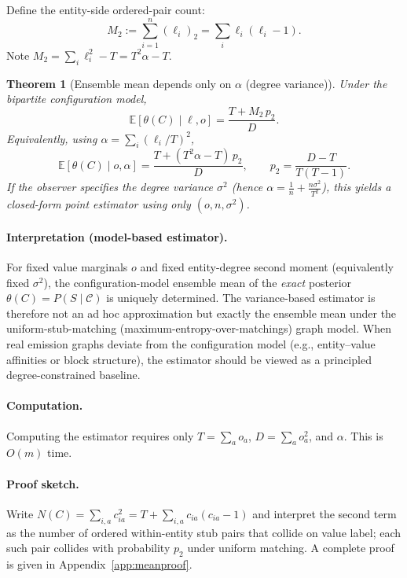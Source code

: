 \documentclass[11pt]{article}
\newcommand{\E}{\mathbb{E}}
\newcommand{\1}{\mathbf{1}}
\newcommand{\fall}[2]{\left(#1\right)_{#2}} %
\newcommand{\coll}{\mathcal{C}} %
\theoremstyle{plain}
\newtheorem{theorem}{Theorem}
\theoremstyle{definition}
\begin{document}
Define the entity-side ordered-pair count:
\[
M_2 := \sum_{i=1}^n \fall{\ell_i}{2} = \sum_i \ell_i(\ell_i-1).
\]
Note $M_2 = \sum_i \ell_i^2 - T = T^2\alpha - T$.

\begin{theorem}[Ensemble mean depends only on $\alpha$ (degree variance)]
\label{thm:mean}
Under the bipartite configuration model,
\[
\boxed{
\E[\theta(C)\mid \ell,o]
=
\frac{T + M_2\,p_2}{D}.
}
\]
Equivalently, using $\alpha = \sum_i(\ell_i/T)^2$,
\[
\boxed{
\E[\theta(C)\mid o,\alpha]
=
\frac{T + (T^2\alpha - T)\,p_2}{D},
\qquad
p_2=\frac{D-T}{T(T-1)}.
}
\]
If the observer specifies the degree variance $\sigma^2$ (hence $\alpha = \frac{1}{n}+\frac{n\sigma^2}{T^2}$), this yields a closed-form point estimator using only $(o,n,\sigma^2)$.
\end{theorem}

\paragraph{Interpretation (model-based estimator).}
For fixed value marginals $o$ and fixed entity-degree second moment (equivalently fixed $\sigma^2$), the configuration-model ensemble mean of the \emph{exact} posterior $\theta(C)=P(S\mid \coll)$ is uniquely determined.
The variance-based estimator is therefore not an ad hoc approximation but exactly the ensemble mean under the uniform-stub-matching (maximum-entropy-over-matchings) graph model.
When real emission graphs deviate from the configuration model (e.g., entity--value affinities or block structure), the estimator should be viewed as a principled degree-constrained baseline.

\paragraph{Computation.}
Computing the estimator requires only $T=\sum_a o_a$, $D=\sum_a o_a^2$, and $\alpha$.
This is $O(m)$ time.

\paragraph{Proof sketch.}
Write $N(C)=\sum_{i,a} c_{ia}^2 = T + \sum_{i,a} c_{ia}(c_{ia}-1)$ and interpret the second term as the number of ordered within-entity stub pairs that collide on value label; each such pair collides with probability $p_2$ under uniform matching.
A complete proof is given in Appendix~\ref{app:meanproof}.

\end{document}

